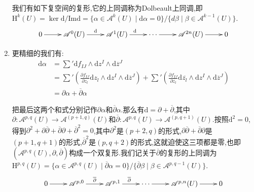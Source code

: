 \begin{enumerate}
	我们有如下复空间的复形,它的上同调称为Dolbeault上同调,即$\mathrm{H}^k(U)=\ker\mathrm{d}/\mathrm{Im}\mathrm{d}=\{\alpha\in\mathscr{A}^k(U)\mid\mathrm{d}\alpha=0\}/\{d\beta\mid\beta\in\mathscr{A}^{k-1}(U)\}$.
	$$\xymatrix{0\ar[r]&\mathscr{A}^0(U)\ar[r]^{\mathrm{d}}&\mathscr{A}^1(U)\ar[r]^{\mathrm{d}}&\cdots\ar[r]&\mathscr{A}^{2n}(U)\ar[r]&0}$$
	\item 更精细的我们有:
	\begin{align*}
		\mathrm{d}\alpha&=\sum\nolimits'\mathrm{d}f_{IJ}\wedge\mathrm{d}z^I\wedge\mathrm{d}\overline{z}^J\\&=\sum\nolimits'\left(\frac{\partial f_{IJ}}{\partial z_l}\mathrm{d}z_l\wedge\mathrm{d}z^I\wedge\mathrm{d}\overline{z}^J\right)+\sum\nolimits'\left(\frac{\partial f_{IJ}}{\partial\overline{z_l}}\mathrm{d}\overline{z_l}\wedge\mathrm{d}z^I\wedge\mathrm{d}\overline{z}^J\right)\\&=\partial\alpha+\overline{\partial}\alpha
	\end{align*}
	
	把最后这两个和式分别记作$\partial\alpha$和$\overline{\partial}\alpha$.那么有$\mathrm{d}=\partial+\overline{\partial}$,其中$\partial:\mathscr{A}^{p,q}(U)\to\mathscr{A}^{(p+1,q)}(U)$和$\overline{\partial}:\mathscr{A}^{p,q}(U)\to\mathscr{A}^{(p,q+1)}(U)$.按照$\mathrm{d}^2=0$,得到$\partial^2+\partial\overline{\partial}+\overline{\partial}\partial+\overline{\partial}^2=0$,其中$\partial^2$是$(p+2,q)$的形式,$\partial\overline{\partial}+\overline{\partial}\partial$是$(p+1,q+1)$的形式,$\overline{\partial}^2$是$(p,q+2)$的形式,这就迫使这三项都是零,也即$(\mathscr{A}^{p,q}(U),\partial,\overline{\partial})$构成一个双复形.我们记关于$\overline{\partial}$的复形的上同调为$\mathrm{H}^{p,q}(U)=\{\alpha\in\mathscr{A}^{p,q}(U)\mid\overline{\partial}\alpha=0\}/\{\overline{\partial}\beta\mid\beta\in\mathscr{A}^{p,q-1}(U)\}$.
	$$\xymatrix{0\ar[r]&\mathscr{A}^{p,0}\ar[r]^{\overline{\partial}}&\mathscr{A}^{p,1}\ar[r]^{\overline{\partial}}&\cdots\ar[r]&\mathscr{A}^{p,n}(U)\ar[r]&0}$$
\end{enumerate}

